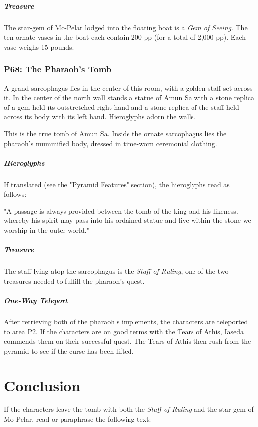 \documentclass[10pt,a4paper,twoside,bg=print,twocolumn,openany,nodeprecatedcode]{dndbook}
\begin{document}
\subparagraph{Treasure}
The star-gem of Mo-Pelar lodged into the floating boat is a \textit{Gem of Seeing}. The ten ornate vases in the boat each contain 200 pp (for a total of 2,000 pp). Each vase weighs 15 pounds.

\subsubsection{P68: The Pharaoh's Tomb}
\begin{DndReadAloud}{}
A grand sarcophagus lies in the center of this room, with a golden staff set across it. In the center of the north wall stands a statue of Amun Sa with a stone replica of a gem held its outstretched right hand and a stone replica of the staff held across its body with its left hand. Hieroglyphs adorn the walls.

\end{DndReadAloud}

This is the true tomb of Amun Sa. Inside the ornate sarcophagus lies the pharaoh's mummified body, dressed in time-worn ceremonial clothing.

\subparagraph{Hieroglyphs}
If translated (see the "Pyramid Features" section), the hieroglyphs read as follows:

\begin{DndReadAloud}{}
"A passage is always provided between the tomb of the king and his likeness, whereby his spirit may pass into his ordained statue and live within the stone we worship in the outer world."

\end{DndReadAloud}

\subparagraph{Treasure}
The staff lying atop the sarcophagus is the \textit{Staff of Ruling}, one of the two treasures needed to fulfill the pharaoh's quest.

\subparagraph{One-Way Teleport}
After retrieving both of the pharaoh's implements, the characters are teleported to area P2. If the characters are on good terms with the Tears of Athis, Iaseda commends them on their successful quest. The Tears of Athis then rush from the pyramid to see if the curse has been lifted.

\section{Conclusion}
If the characters leave the tomb with both the \textit{Staff of Ruling} and the star-gem of Mo-Pelar, read or paraphrase the following text:
\end{document}
